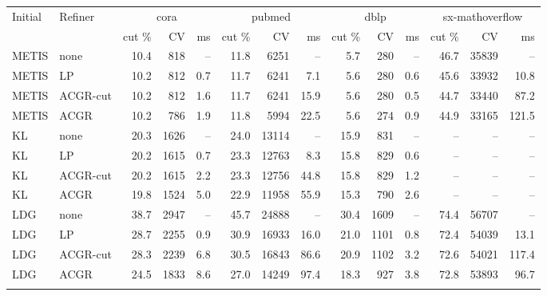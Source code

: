 \begin{tabular}{llrrrrrrrrrrrr}
\toprule
Initial & Refiner & \multicolumn{3}{c}{cora} & \multicolumn{3}{c}{pubmed} & \multicolumn{3}{c}{dblp} & \multicolumn{3}{c}{sx-mathoverflow} \\
 & & cut \% & CV & ms & cut \% & CV & ms & cut \% & CV & ms & cut \% & CV & ms \\
\midrule
METIS & none & 10.4 & 818 & -- & 11.8 & 6251 & -- & 5.7 & 280 & -- & 46.7 & 35839 & -- \\
METIS & LP & 10.2 & 812 & 0.7 & 11.7 & 6241 & 7.1 & 5.6 & 280 & 0.6 & 45.6 & 33932 & 10.8 \\
METIS & ACGR-cut & 10.2 & 812 & 1.6 & 11.7 & 6241 & 15.9 & 5.6 & 280 & 0.5 & 44.7 & 33440 & 87.2 \\
METIS & ACGR & 10.2 & 786 & 1.9 & 11.8 & 5994 & 22.5 & 5.6 & 274 & 0.9 & 44.9 & 33165 & 121.5 \\
\addlinespace
KL & none & 20.3 & 1626 & -- & 24.0 & 13114 & -- & 15.9 & 831 & -- & -- & -- & -- \\
KL & LP & 20.2 & 1615 & 0.7 & 23.3 & 12763 & 8.3 & 15.8 & 829 & 0.6 & -- & -- & -- \\
KL & ACGR-cut & 20.2 & 1615 & 2.2 & 23.3 & 12756 & 44.8 & 15.8 & 829 & 1.2 & -- & -- & -- \\
KL & ACGR & 19.8 & 1524 & 5.0 & 22.9 & 11958 & 55.9 & 15.3 & 790 & 2.6 & -- & -- & -- \\
\addlinespace
LDG & none & 38.7 & 2947 & -- & 45.7 & 24888 & -- & 30.4 & 1609 & -- & 74.4 & 56707 & -- \\
LDG & LP & 28.7 & 2255 & 0.9 & 30.9 & 16933 & 16.0 & 21.0 & 1101 & 0.8 & 72.4 & 54039 & 13.1 \\
LDG & ACGR-cut & 28.3 & 2239 & 6.8 & 30.5 & 16843 & 86.6 & 20.9 & 1102 & 3.2 & 72.6 & 54021 & 117.4 \\
LDG & ACGR & 24.5 & 1833 & 8.6 & 27.0 & 14249 & 97.4 & 18.3 & 927 & 3.8 & 72.8 & 53893 & 96.7 \\
\addlinespace
\bottomrule
\end{tabular}
